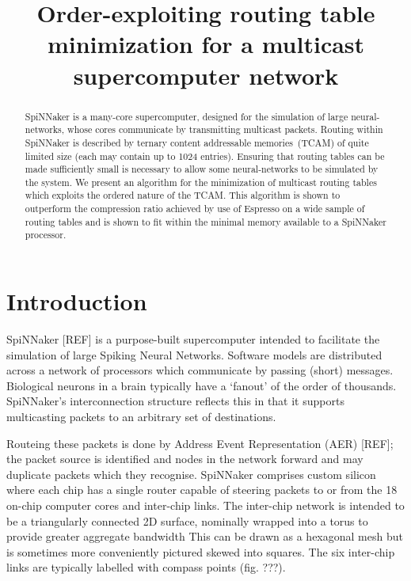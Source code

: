 \documentclass[conference]{IEEEtran}
\title{Order-exploiting routing table minimization for a multicast supercomputer network}
\author{%
  \IEEEauthorblockN{Andrew~Mundy and Jim~D.~Garside}
  \IEEEauthorblockA{\{\texttt{andrew.mundy}, \texttt{jim.garside}\}\texttt{@manchester.ac.uk}\\
                    School of Computer Science,\\
		    University of Manchester,\\
                    M13 9PL, UK}
}
\begin{document}
  \maketitle

  \begin{abstract}
    SpiNNaker is a many-core supercomputer, designed for the simulation of large neural-networks, whose cores communicate by transmitting multicast packets.
    Routing within SpiNNaker is described by ternary content addressable memories~(TCAM) of quite limited size (each may contain up to 1024 entries).
    Ensuring that routing tables can be made sufficiently small is necessary to allow some neural-networks to be simulated by the system.
    We present an algorithm for the minimization of multicast routing tables which exploits the ordered nature of the TCAM.
    This algorithm is shown to outperform the compression ratio achieved by use of Espresso on a wide sample of routing tables and is shown to fit within the minimal memory available to a SpiNNaker processor.
  \end{abstract}

  \section{Introduction}

  SpiNNaker [REF] is a purpose-built supercomputer intended to facilitate the simulation of large Spiking Neural Networks.
  Software models are distributed across a network of processors which communicate by passing (short) messages.
  Biological neurons in a brain typically have a `fanout' of the order of thousands.
  SpiNNaker's interconnection structure reflects this in that it supports multicasting packets to an arbitrary set of destinations.

  Routeing these packets is done by Address Event Representation (AER) [REF]; the packet source is identified and nodes in the network forward and may duplicate packets which they recognise.
  SpiNNaker comprises custom silicon where each chip has a single router capable of steering packets to or from the 18 on-chip computer cores and inter-chip links.
  The inter-chip network is intended to be a triangularly connected 2D surface, nominally wrapped into a torus to provide greater aggregate bandwidth
  This can be drawn as a hexagonal mesh but is sometimes more conveniently pictured skewed into squares.
  The six inter-chip links are typically labelled with compass points (fig. ???).
\end{document}
